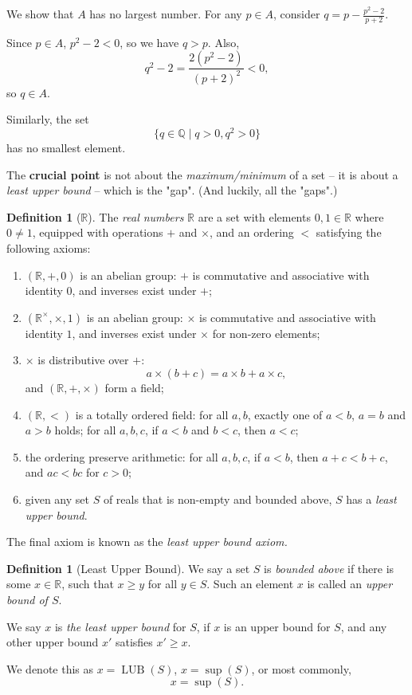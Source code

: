\documentclass{article}
\theoremstyle{definition}
\newtheorem{definition}[theorem]{Definition}
\theoremstyle{remark}
\newcommand{\pqty}[1]{\left(#1\right)}
\newcommand{\set}[2]{\{#1\mid #2\}}
\newcommand{\multiplicative}{^{\times}}
\newcommand{\LUB}{\operatorname{LUB}}
\newcommand{\supremum}{\sup}
\newcommand{\QQ}{\mathbb{Q}}
\newcommand{\RR}{\mathbb{R}}
\begin{document}
We show that \(A\) has no largest number. For any \(p \in A\), consider \(q = p - \frac{p^2 - 2}{p + 2}\).

Since \(p \in A\), \(p^2 - 2 < 0\), so we have \(q > p\). Also,
\[
    q^2 - 2 = \frac{2 \pqty{p^2 - 2}}{\pqty{p + 2}^2} < 0,
\]
so \(q \in A\).

Similarly, the set
\[
    \set{q \in \QQ}{q > 0, q^2 > 0}
\]
has no smallest element.

The \textbf{crucial point} is not about the \emph{maximum/minimum} of a set -- it is about a \emph{least upper bound} -- which is the "gap". (And luckily, all the "gaps".)

\begin{definition}[\(\RR\)]
    The \emph{real numbers} \(\RR\) are a set with elements \(0, 1 \in \RR\) where \(0 \neq 1\), equipped with operations \(+\) and \(\times\), and an ordering \(<\) satisfying the following axioms:
    \begin{enumerate}
        \item \(\pqty{\RR, +, 0}\) is an abelian group: \(+\) is commutative and associative with identity \(0\), and inverses exist under \(+\);
        \item \(\pqty{\RR\multiplicative, \times, 1}\) is an abelian group: \(\times\) is commutative and associative with identity \(1\), and inverses exist under \(\times\) for non-zero elements;
        \item \(\times\) is distributive over \(+\):
        \[
            a \times \pqty{b + c} = a \times b + a \times c,
        \]
        and \(\pqty{\RR, +, \times}\) form a field;
        \item \(\pqty{\RR, <}\) is a totally ordered field: for all \(a, b\), exactly one of \(a < b\), \(a = b\) and \(a > b\) holds; for all \(a, b, c\), if \(a < b\) and \(b < c\), then \(a < c\);
        \item the ordering preserve arithmetic: for all \(a, b, c\), if \(a < b\), then \(a + c < b + c\), and \(ac < bc\) for \(c > 0\);
        \item given any set \(S\) of reals that is non-empty and bounded above, \(S\) has a \emph{least upper bound}.
    \end{enumerate}

    The final axiom is known as the \emph{least upper bound axiom.}
\end{definition}

\begin{definition}[Least Upper Bound]
    We say a set \(S\) is \emph{bounded above} if there is some \(x \in \RR\), such that \(x \geq y\) for all \(y \in S\). Such an element \(x\) is called an \emph{upper bound of \(S\)}.

    We say \(x\) is \emph{the least upper bound} for \(S\), if \(x\) is an upper bound for \(S\), and any other upper bound \(x'\) satisfies \(x' \geq x\).

    We denote this as \(x = \LUB\pqty{S}\), \(x = \supremum\pqty{S}\), or most commonly,
    \[
        x = \sup\pqty{S}.
    \]
\end{definition}
\end{document}
